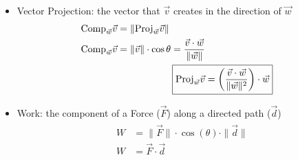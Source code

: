 \documentclass{article}
\begin{document}
\begin{itemize}
  \item Vector Projection: the vector that $\vec{v}$ creates in the direction of $\vec{w}$
  \begin{align}
    \begin{split}
      \textrm{Comp}_{\vec{w}}\vec{v} &= \|\textrm{Proj}_{\vec{w}}\vec{v}\| \\
      \textrm{Comp}_{\vec{w}}\vec{v} &= \|\vec{v}\|\cdot\cos{\theta} = \frac{\vec{v}\cdot\vec{w}}{\|\vec{w}\|}
    \end{split} \\
    \Aboxed{
      \textrm{Proj}_{\vec{w}}\vec{v} &= \left( \frac{\vec{v}\cdot\vec{w}}{\|\vec{w}\|^2} \right) \cdot\vec{w}
    }
  \end{align}

  \item Work: the component of a Force ($\vec{F}$) along a directed path ($\vec{d}$)
  \begin{align}
    \begin{split}
      W &= \|\vec{F}\|\cdot\cos(\theta)\cdot\|\vec{d}\| \\
      W &= \vec{F}\cdot\vec{d}
    \end{split}
  \end{align}
\end{itemize}
\end{document}
